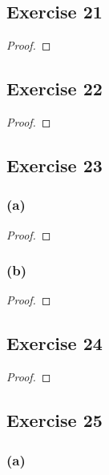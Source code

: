\documentclass[14pt]{extarticle}
\begin{document}
\subsection{Exercise 21}

\begin{proof}

\end{proof}

\subsection{Exercise 22}

\begin{proof}

\end{proof}

\subsection{Exercise 23}

\subsubsection{(a)}

\begin{proof}

\end{proof}

\subsubsection{(b)}

\begin{proof}

\end{proof}

\subsection{Exercise 24}

\begin{proof}

\end{proof}

\subsection{Exercise 25}

\subsubsection{(a)}
\end{document}
